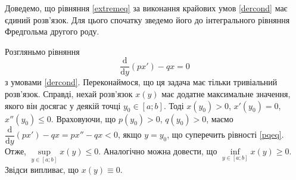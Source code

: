 \documentclass[14pt,twoside]{extreport}
\theoremstyle{mystyle}
\numberwithin{equation}{chapter}
\begin{document}
Доведемо, що рівняння \eqref{extremeq} за виконання крайових умов \eqref{dercond} має єдиний розв'язок. Для цього спочатку зведемо його до інтегрального рівняння Фредгольма другого роду.

Розгляньмо рівняння
\begin{equation}\label{pqeq}
	\displaystyle \frac{\mathrm{d}}{\mathrm{d}y}(px')-qx=0
\end{equation}
з умовами \eqref{dercond}. Переконаймося, що ця задача має тільки тривіальний розв'язок. Справді, нехай розв'язок $x(y)$ має додатне максимальне значення, якого він досягає у деякій точці $y_0 \in [a; b]$. Тоді $x(y_0) > 0$, $x'(y_0) = 0$, $x''(y_0) \leqslant 0$. Враховуючи, що $p(y_0) > 0$, $q(y_0) > 0$, маємо $\dfrac{\mathrm{d}}{\mathrm{d}y}(px') - qx = px'' - qx < 0$, якщо $y=y_0$, що суперечить рівності \eqref{pqeq}. Отже, $\sup\limits_{y\in [a; b]} x(y) \leqslant 0$. Аналогічно можна довести, що $\inf\limits_{y \in [a; b]} x(y) \geqslant 0$. Звідси випливає, що $x(y) \equiv 0$.
\end{document}
